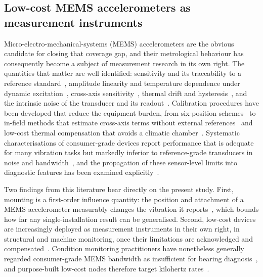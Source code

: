 \subsection{Low-cost MEMS accelerometers as measurement instruments}
\label{subsec:mems_metrology}
Micro-electro-mechanical-systems (MEMS) accelerometers are the obvious candidate
for closing that coverage gap, and their metrological behaviour has consequently
become a subject of measurement research in its own right. The quantities that
matter are well identified: sensitivity and its traceability to a reference
standard~\cite{prato2021mems}, amplitude linearity and temperature dependence
under dynamic excitation~\cite{schiavi2023mems}, cross-axis
sensitivity~\cite{wang2025mems, najafabadi2024mems}, thermal drift and
hysteresis~\cite{xu2021mems2, kim2025mems, khankalantary2021mems}, and the
intrinsic noise of the transducer and its readout~\cite{li2020mems}. Calibration
procedures have been developed that reduce the equipment burden, from six-position
schemes~\cite{xu2021mems} to in-field methods that estimate cross-axis terms
without external references~\cite{wang2025mems} and low-cost thermal compensation
that avoids a climatic chamber~\cite{khankalantary2021mems}. Systematic
characterisations of consumer-grade devices report performance that is adequate
for many vibration tasks but markedly inferior to reference-grade transducers in
noise and bandwidth~\cite{srokosz2024mems, grouios2022accelerometers}, and the
propagation of these sensor-level limits into diagnostic features has been
examined explicitly~\cite{demilia2021mems}.

Two findings from this literature bear directly on the present study. First,
mounting is a first-order influence quantity: the position and attachment of a
MEMS accelerometer measurably changes the vibration it reports~\cite{staszewski2025mems},
which bounds how far any single-installation result can be generalised. Second,
low-cost devices are increasingly deployed as measurement instruments in their own
right, in structural and machine monitoring, once their limitations are
acknowledged and compensated~\cite{lee2026mems, sayghe2026smartphone}. Condition
monitoring practitioners have nonetheless generally regarded consumer-grade MEMS
bandwidth as insufficient for bearing diagnosis~\cite{pedotti2020lowcost}, and
purpose-built low-cost nodes therefore target kilohertz
rates~\cite{jakobsen2024lowcost, shukla2020smartsensor}.

